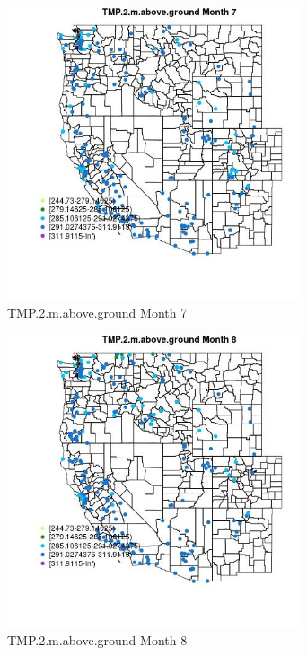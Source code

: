 \begin{figure} 
\centering  
\includegraphics[width=0.77\textwidth]{Code_Outputs/Report_ML_input_PM25_Step4_part_e_de_duplicated_aveswNAs_MapObsMo7TMP2maboveground.jpg} 
\caption{\label{fig:Report_ML_input_PM25_Step4_part_e_de_duplicated_aveswNAsMapObsMo7TMP2maboveground}TMP.2.m.above.ground Month 7} 
\end{figure} 
 

\begin{figure} 
\centering  
\includegraphics[width=0.77\textwidth]{Code_Outputs/Report_ML_input_PM25_Step4_part_e_de_duplicated_aveswNAs_MapObsMo8TMP2maboveground.jpg} 
\caption{\label{fig:Report_ML_input_PM25_Step4_part_e_de_duplicated_aveswNAsMapObsMo8TMP2maboveground}TMP.2.m.above.ground Month 8} 
\end{figure} 
 

